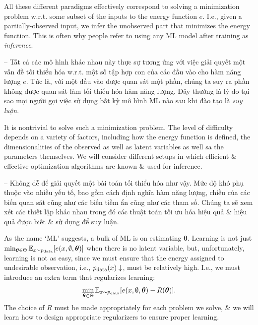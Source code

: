 \documentclass{article}
\begin{document}
All these different paradigms effectively correspond to solving a minimization problem w.r.t. some subset of the inputs to the energy function $e$. I.e., given a partially-observed input, we infer the unobserved part that minimizes the energy function. This is often why people refer to using any ML model after training as {\it inference}.

-- Tất cả các mô hình khác nhau này thực sự tương ứng với việc giải quyết một vấn đề tối thiểu hóa w.r.t. một số tập hợp con của các đầu vào cho hàm năng lượng $e$. Tức là, với một đầu vào được quan sát một phần, chúng ta suy ra phần không được quan sát làm tối thiểu hóa hàm năng lượng. Đây thường là lý do tại sao mọi người gọi việc sử dụng bất kỳ mô hình ML nào sau khi đào tạo là {\it suy luận}.

It is nontrivial to solve such a minimization problem. The level of difficulty depends on a variety of factors, including how the energy function is defined, the dimensionalities of the observed as well as latent variables as well sa the parameters themselves. We will consider different setups in which efficient \& effective optimization algorithms are known \& used for inference.

-- Không dễ để giải quyết một bài toán tối thiểu hóa như vậy. Mức độ khó phụ thuộc vào nhiều yếu tố, bao gồm cách định nghĩa hàm năng lượng, chiều của các biến quan sát cũng như các biến tiềm ẩn cũng như các tham số. Chúng ta sẽ xem xét các thiết lập khác nhau trong đó các thuật toán tối ưu hóa hiệu quả \& hiệu quả được biết \& sử dụng để suy luận.

As the name `ML' suggests, a bulk of ML is on estimating $\boldsymbol{\theta}$. Learning is not just $\min_{\boldsymbol{\theta}\in\Theta} \mathbb{E}_{x\sim p_{\rm data}}[e(x,\emptyset,\boldsymbol{\theta})]$ when there is no latent variable, but, unfortunately, learning is not as easy, since we must ensure that the energy assigned to undesirable observation, i.e., $p_{\rm data}(x)\downarrow$, must be relatively high. I.e., we must introduce an extra term that regularizes learning:
\begin{equation*}
	\min_{\boldsymbol{\theta}\in\Theta} \mathbb{E}_{x\sim p_{\rm data}}[e(x,\emptyset,\boldsymbol{\theta}) - R(\boldsymbol{\theta})].
\end{equation*}
The choice of $R$ must be made appropriately for each problem we solve, \& we will learn how to design appropriate regularizers to ensure proper learning.
\end{document}
